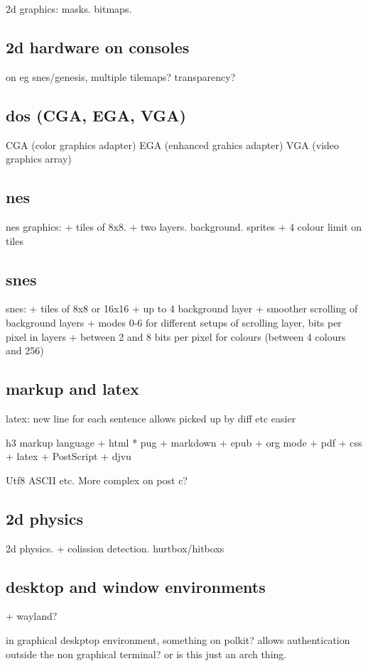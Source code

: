 2d graphics: masks. bitmaps.
\subsection{2d hardware on consoles}
on eg snes/genesis, multiple tilemaps? transparency?

\subsection{dos (CGA, EGA, VGA)}
CGA (color graphics adapter)
EGA (enhanced grahics adapter)
VGA (video graphics array)
\subsection{nes}
nes graphics:
+ tiles of 8x8.
+ two layers. background. sprites
+ 4 colour limit on tiles

\subsection{snes}
snes:
+ tiles of 8x8 or 16x16
+ up to 4 background layer
+ smoother scrolling of background layers
+ modes 0-6 for different setups of scrolling layer, bits per pixel in layers
+ between 2 and 8 bits per pixel for colours (between 4 colours and 256)

\subsection{markup and latex}
latex: new line for each sentence
allows picked up by diff etc easier

h3 markup language
+ html
  * pug
+ markdown
+ epub
+ org mode
+ pdf
+ css
+ latex
+ PostScript
+ djvu

Utf8 ASCII etc. More complex on post c?
\subsection{2d physics}

2d physics.
+ colission detection. hurtbox/hitboxs

\subsection{desktop and window environments}
+ wayland?

in graphical deskptop environment, something on polkit? allows authentication outside the non graphical terminal? or is this just an arch thing.

